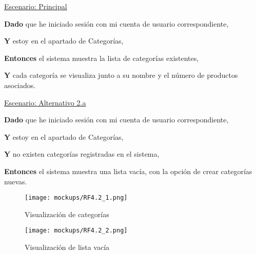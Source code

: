 \underline{Escenario: Principal}\par
\vspace{0.15cm}

\textbf{Dado} que he iniciado sesión con mi cuenta de usuario correspondiente,\par
\textbf{Y} estoy en el apartado de Categorías,\par
\textbf{Entonces} el sistema muestra la lista de categorías existentes,\par
\textbf{Y} cada categoría se visualiza junto a su nombre y el número de productos asociados.\par


\vspace{0.20cm}

\underline{Escenario: Alternativo 2.a}\par
\vspace{0.15cm}

\textbf{Dado} que he iniciado sesión con mi cuenta de usuario correspondiente,\par
\textbf{Y} estoy en el apartado de Categorías,\par
\textbf{Y} no existen categorías registradas en el sistema,\par
\textbf{Entonces} el sistema muestra una lista vacía, con la opción de crear categorías nuevas.\par

\vspace{0.20cm}

\begin{figure}[H]
    \texttt{[image: mockups/RF4.2\_1.png]}
    \caption{Visualización de categorías}
   \end{figure}
\vspace{1.0cm}

\begin{figure}[H]
    \texttt{[image: mockups/RF4.2\_2.png]}
    \caption{Visualización de lista vacía}
   \end{figure}
\vspace{1.0cm}

\newpage %